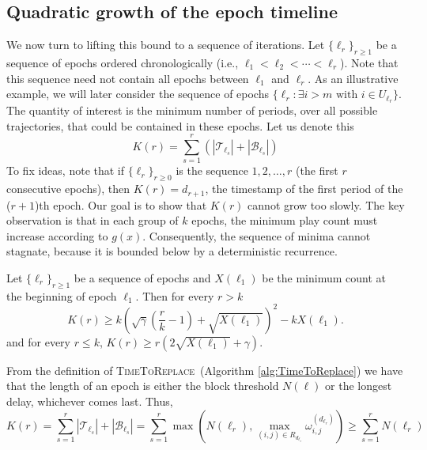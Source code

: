 \documentclass[opre,blindrev]{informs3}
\newcommand{\TimeToReplace}{\textsc{TimeToReplace}\,}
\begin{document}
\begin{APPENDICES}
\subsection{Quadratic growth of the epoch timeline}
We now turn to lifting this bound to a sequence of iterations. Let \(\{\ell_{r}\}_{r\geq 1}\) be a sequence of epochs ordered chronologically (i.e., \(\ell_{1}< \ell_{2}<\cdots < \ell_{r}\)). Note that this sequence need not contain all epochs between \(\ell_1\) and \(\ell_r\). As an illustrative example, we will later consider the sequence of epochs \(\{\ell_r :\exists i>m \text{ with } i\in U_{\ell_r}\}\). The quantity of interest is the minimum number of periods, over all possible trajectories, that could be contained in these epochs. Let us denote this
\[K(r)=\sum_{s=1}^r(|\mathcal{T}_{\ell_s}|+|\mathcal{B}_{\ell_s}|)\]
To fix ideas, note that if \(\{\ell_{r}\}_{r\geq 0}\) is the sequence \(1,2,\dots, r\) (the first \(r\) consecutive epochs), then \(K(r)=d_{r+1}\), the timestamp of the first period of the (\(r+1\))th epoch. Our goal is to show that \(K(r)\) cannot grow too slowly. The key observation is that in each group of \(k\) epochs, the minimum play count must increase according to \(g(x)\). Consequently, the sequence of minima cannot stagnate, because it is bounded below by a deterministic recurrence. 

\begin{lemma}\label{lem:ell-t-bound}
    Let \(\{\ell_{r}\}_{r\geq 1}\) be a sequence of epochs and \(X(\ell_1)\) be the minimum count at the beginning of epoch \(\ell_1\). Then for every  \(r > k\)
    \[
        K(r)
        \ge
        k\left(\sqrt{\gamma}\left(\frac{r}{k} - 1\right)+\sqrt{X(\ell_1)}\right)^2-kX(\ell_1).
    \]
    and for every \(r \leq k\), \(K(r) \geq r\left(2\sqrt{X(\ell_1)}+ \gamma\right)\).
\end{lemma}

    From the definition of \TimeToReplace\,\,(Algorithm \ref{alg:TimeToReplace}) we have that the length of an epoch is either the block threshold \(N(\ell)\) or the longest delay, whichever comes last. Thus,
    \[ K(r)=\sum_{s=1}^r|\mathcal{T}_{\ell_s}|+|\mathcal{B}_{\ell_s}|=\sum_{s=1}^r\max\left(N(\ell_r), \max_{(i,j)\in R_{d_{\ell_r}}}\omega_{i,j}^{(d_{\ell_r})}\right)\geq \sum_{s=1}^r N(\ell_r)
    \]
    

\end{APPENDICES}
\end{document}
